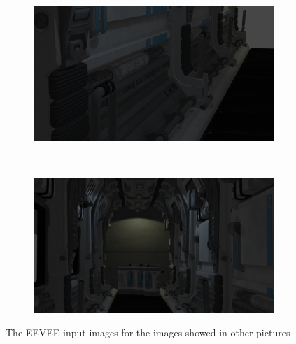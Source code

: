 \begin{figure}[h!]
    \centering
    \begin{subfigure}[b]{0.9\textwidth}
     \includegraphics[width=\textwidth]{figures/result/eevee/s9_camera_9_eevee.png}
     \caption{}\label{subfig:1}
    \end{subfigure}
    \\ \vspace{0.2cm}
    \begin{subfigure}[b]{0.9\textwidth}
     \includegraphics[width=\textwidth]{figures/result/eevee/s9_camera_80_eevee.png}
     \caption{}
    \end{subfigure}
    
    \caption{The EEVEE input images for the images showed in other pictures}
    \label{fig:eevee_images}
\end{figure}

